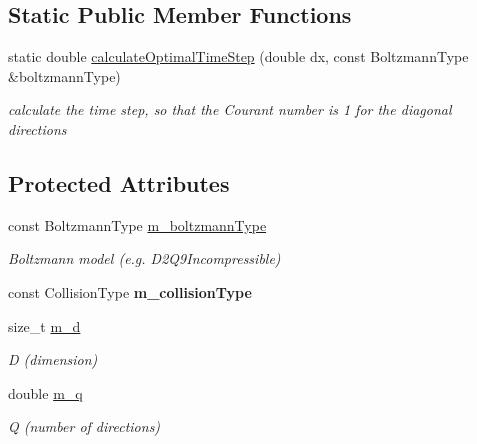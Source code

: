 \subsection*{Static Public Member Functions}
\begin{DoxyCompactItemize}
\item 
\hypertarget{classnatrium_1_1Collision_ad0ca1b0b33783e077d68b08892933f39}{static double \hyperlink{classnatrium_1_1Collision_ad0ca1b0b33783e077d68b08892933f39}{calculate\-Optimal\-Time\-Step} (double dx, const Boltzmann\-Type \&boltzmann\-Type)}\label{classnatrium_1_1Collision_ad0ca1b0b33783e077d68b08892933f39}

\begin{DoxyCompactList}\small\item\em calculate the time step, so that the Courant number is 1 for the diagonal directions \end{DoxyCompactList}\end{DoxyCompactItemize}
\subsection*{Protected Attributes}
\begin{DoxyCompactItemize}
\item 
\hypertarget{classnatrium_1_1Collision_aedbd709beac24029ee46002b123471a3}{const Boltzmann\-Type \hyperlink{classnatrium_1_1Collision_aedbd709beac24029ee46002b123471a3}{m\-\_\-boltzmann\-Type}}\label{classnatrium_1_1Collision_aedbd709beac24029ee46002b123471a3}

\begin{DoxyCompactList}\small\item\em Boltzmann model (e.\-g. D2\-Q9\-Incompressible) \end{DoxyCompactList}\item 
\hypertarget{classnatrium_1_1Collision_aae138b2fc3eb1a718a0b9bf3d75f9fd6}{const Collision\-Type {\bfseries m\-\_\-collision\-Type}}\label{classnatrium_1_1Collision_aae138b2fc3eb1a718a0b9bf3d75f9fd6}

\item 
\hypertarget{classnatrium_1_1Collision_ae4a33343ec73303ad63dfde4ac574cd6}{size\-\_\-t \hyperlink{classnatrium_1_1Collision_ae4a33343ec73303ad63dfde4ac574cd6}{m\-\_\-d}}\label{classnatrium_1_1Collision_ae4a33343ec73303ad63dfde4ac574cd6}

\begin{DoxyCompactList}\small\item\em D (dimension) \end{DoxyCompactList}\item 
\hypertarget{classnatrium_1_1Collision_a81cefcbe828514dbd71fe8ea8197724a}{double \hyperlink{classnatrium_1_1Collision_a81cefcbe828514dbd71fe8ea8197724a}{m\-\_\-q}}\label{classnatrium_1_1Collision_a81cefcbe828514dbd71fe8ea8197724a}

\begin{DoxyCompactList}\small\item\em Q (number of directions) \end{DoxyCompactList}\end{DoxyCompactItemize}


